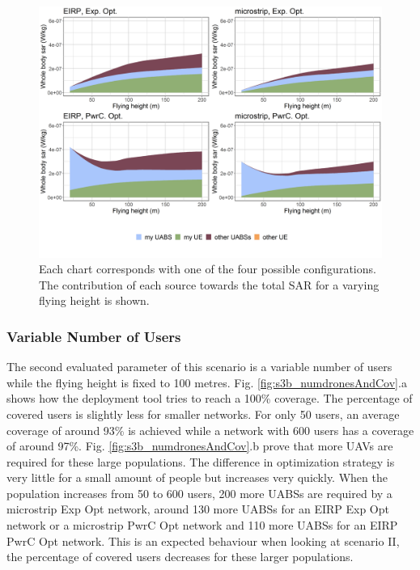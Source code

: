 \documentclass[twocolumn]{phdsymp} %
\begin{document}
\begin{figure}[h!]
  \includegraphics[width=\linewidth]{../results/s3/fhFourSources.png}
  \caption{Each chart corresponds with one of the four possible configurations. The contribution of each source towards the total 
  \acs{SAR} for a varying flying height is shown.}
  \label{fig:s3a_fourSourcesMatrix}
\end{figure}

\FloatBarrier
\subsubsection{Variable Number of Users}

The second evaluated parameter of this scenario is a variable number of users while the flying height is fixed to 100 metres.  
Fig. \ref{fig:s3b_numdronesAndCov}.a shows how the deployment tool tries to reach a 100\% coverage. The percentage
of covered users is slightly less for smaller networks. For only 50 users, an average 
coverage of around 93\% is achieved while a network with 600 users has a coverage of around 97\%.
Fig. \ref{fig:s3b_numdronesAndCov}.b prove that more \gls{UAV}s are required for these large 
populations. 
The difference in optimization strategy is very little for a small amount of people but increases very quickly. 
When the population increases from 50 to 600 users,
 200 more \gls{UABS}s are required by a microstrip \gls{Exp Opt} network,
 around 130 more \gls{UABS}s for an \gls{EIRP} \gls{Exp Opt} network or a microstrip \gls{PwrC Opt} network
 and 110 more \gls{UABS}s for an \gls{EIRP} \gls{PwrC Opt} network.
This is an expected behaviour  when looking at scenario II,
the percentage of covered users decreases for these larger populations.
\end{document}
